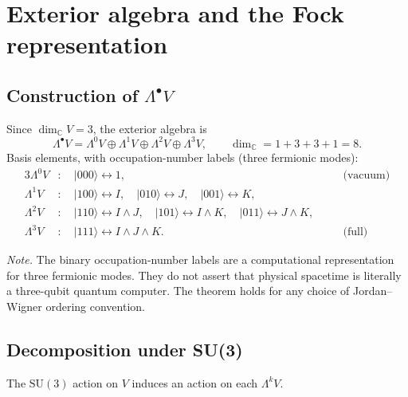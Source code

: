 \documentclass[12pt,a4paper]{article}
\theoremstyle{definition}
\theoremstyle{remark}
\begin{document}
\section{Exterior algebra and the Fock representation}
\label{sec:exterior}

\subsection{Construction of $\Lambda^\bullet V$}

Since $\dim_\mathbb{C} V = 3$, the exterior algebra is
\begin{equation}
  \Lambda^\bullet V = \Lambda^0 V \oplus \Lambda^1 V \oplus \Lambda^2 V \oplus \Lambda^3 V,
  \qquad \dim_\mathbb{C} = 1+3+3+1 = 8.
\end{equation}
Basis elements, with occupation-number labels (three fermionic modes):
\begin{alignat}{3}
  \Lambda^0 V &:\quad \lvert 000\rangle \leftrightarrow 1, & \quad & \text{(vacuum)}\\
  \Lambda^1 V &:\quad \lvert 100\rangle \leftrightarrow I,\quad
                       \lvert 010\rangle \leftrightarrow J,\quad
                       \lvert 001\rangle \leftrightarrow K, &&\\
  \Lambda^2 V &:\quad \lvert 110\rangle \leftrightarrow I\wedge J,\quad
                       \lvert 101\rangle \leftrightarrow I\wedge K,\quad
                       \lvert 011\rangle \leftrightarrow J\wedge K, &&\\
  \Lambda^3 V &:\quad \lvert 111\rangle \leftrightarrow I\wedge J\wedge K.
                      &&\text{(full)}
\end{alignat}

\emph{Note.}  The binary occupation-number labels are a computational
representation for three fermionic modes.  They do not assert that physical
spacetime is literally a three-qubit quantum computer.  The theorem holds for
any choice of Jordan--Wigner ordering convention.

\subsection{Decomposition under SU(3)}

The $\mathrm{SU}(3)$ action on $V$ induces an action on each $\Lambda^k V$.
\end{document}
